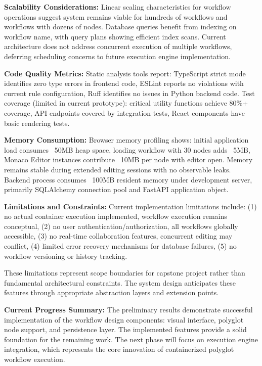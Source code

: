 \documentclass[12pt]{article}
\begin{document}
\hspace{\parindent}\textbf{Scalability Considerations:} Linear scaling characteristics for workflow operations suggest system remains viable for hundreds of workflows and workflows with dozens of nodes. Database queries benefit from indexing on workflow name, with query plans showing efficient index scans. Current architecture does not address concurrent execution of multiple workflows, deferring scheduling concerns to future execution engine implementation.

\hspace{\parindent}\textbf{Code Quality Metrics:} Static analysis tools report: TypeScript strict mode identifies zero type errors in frontend code, ESLint reports no violations with current rule configuration, Ruff identifies no issues in Python backend code. Test coverage (limited in current prototype): critical utility functions achieve 80\%+ coverage, API endpoints covered by integration tests, React components have basic rendering tests.

\hspace{\parindent}\textbf{Memory Consumption:} Browser memory profiling shows: initial application load consumes ~50MB heap space, loading workflow with 30 nodes adds ~5MB, Monaco Editor instances contribute ~10MB per node with editor open. Memory remains stable during extended editing sessions with no observable leaks. Backend process consumes ~100MB resident memory under development server, primarily SQLAlchemy connection pool and FastAPI application object.

\hspace{\parindent}\textbf{Limitations and Constraints:} Current implementation limitations include: (1) no actual container execution implemented, workflow execution remains conceptual, (2) no user authentication/authorization, all workflows globally accessible, (3) no real-time collaboration features, concurrent editing may conflict, (4) limited error recovery mechanisms for database failures, (5) no workflow versioning or history tracking.

These limitations represent scope boundaries for capstone project rather than fundamental architectural constraints. The system design anticipates these features through appropriate abstraction layers and extension points.

\hspace{\parindent}\textbf{Current Progress Summary:} The preliminary results demonstrate successful implementation of the workflow design components: visual interface, polyglot node support, and persistence layer. The implemented features provide a solid foundation for the remaining work. The next phase will focus on execution engine integration, which represents the core innovation of containerized polyglot workflow execution.
\end{document}
